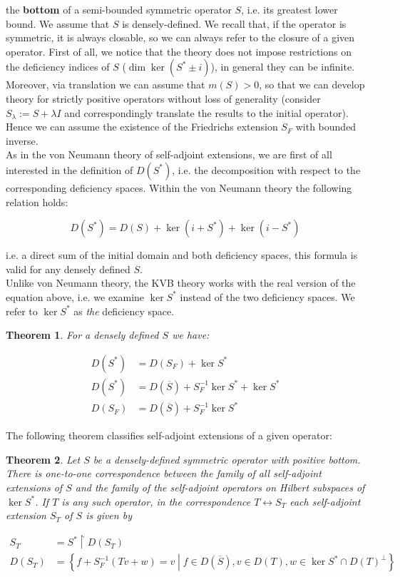 \documentclass[11pt, a4paper, german]{article}
\theoremstyle{plain}
\newtheorem{theorem}{Theorem}
\theoremstyle{definition}
\theoremstyle{remark}
\numberwithin{equation}{section}
\numberwithin{theorem}{section}
\begin{document}
the \textbf{bottom} of a semi-bounded symmetric operator $S$, i.e. its greatest lower bound. We assume that $S$ is densely-defined. We recall that, if the operator is symmetric, it is always closable, so we can always refer to the closure of a given operator. First of all, we notice that the theory does not impose restrictions on the deficiency indices of $S$ ($\dim \ker (S^* \pm i)$), in general they can be infinite. Moreover, via translation we can assume that $m(S) > 0$, so that we can develop theory for strictly positive operators without loss of generality (consider $S_\lambda := S + \lambda I$ and correspondingly translate the results to the initial operator). Hence we can assume the existence of the Friedrichs extension $S_F$ with bounded inverse.\\

As in the von Neumann theory of self-adjoint extensions, we are first of all interested in the definition of $D(S^*)$, i.e. the decomposition with respect to the corresponding deficiency spaces. Within the von Neumann theory the following relation holds:

$$D(S^*) = D(S) + \ker(i+S^*) + \ker(i-S^*)$$

i.e. a direct sum of the initial domain and both deficiency spaces, this formula is valid for any densely defined $S$.\\

Unlike von Neumann theory, the KVB theory works with the real version of the equation above, i.e. we examine $ \ker S^* $ instead of the two deficiency spaces. We refer to $\ker S^*$ as \textit{the} deficiency space.

\begin{theorem}\label{kvb-dec}
For a densely defined $S$ we have: 

\begin{align}
D(S^*) &= D(S_F) + \ker S^*\\
D(S^*) &= D(\overline S) + S_F^{-1} \ker S^* + \ker S^*\\
D(S_F) &= D(\overline S) + S_F^{-1} \ker S^*
\end{align}

\end{theorem}

The following theorem classifies self-adjoint extensions of a given operator:

\begin{theorem}\label{kvb-main}
Let $S$ be a densely-defined symmetric operator with positive bottom. There is one-to-one correspondence between the family of all self-adjoint extensions of $S$ and the family of the self-adjoint operators on Hilbert subspaces of $\ker S^*$. If $T$ is any such operator, in the correspondence $T \leftrightarrow S_T$ each self-adjoint extension $S_T$ of $S$ is given by

\begin{align}
S_T &= S^* \upharpoonright D(S_T) \\
D(S_T) &= \left\{ f + S_F^{-1} (Tv + w) = v \middle| f\in D(\overline S), v \in D(T), w \in \ker S^* \cap D(T)^{\perp} \right\}
\end{align}

\end{theorem}
\end{document}
